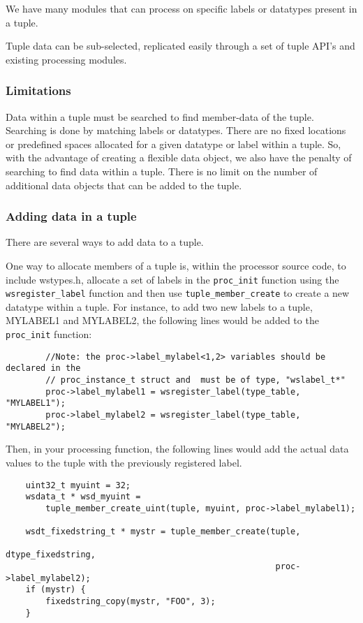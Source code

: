 \documentclass[11pt]{article}
\begin{document}
We have many modules that can process on specific labels or datatypes present 
in a tuple. 

Tuple data can be sub-selected, replicated easily through a set of tuple API's 
and existing processing modules.

\subsubsection{Limitations}
Data within a tuple must be searched to find member-data of the tuple.  
Searching is done by matching labels or datatypes. There are no fixed locations 
or  predefined spaces allocated for a given datatype or label within a tuple. 
So, with the advantage of creating a flexible data object, we also have the 
penalty of searching to find data within a tuple.  There is no limit on 
the number of additional data objects that can be added to the tuple.  

\subsubsection{Adding data in a tuple}\label{sec:addingdata}
There are several ways to add data to a tuple. 

One way to allocate members of a tuple is, within the processor source code, to
include wstypes.h, allocate a set of labels in the \texttt{proc\_init} function
using the \texttt{wsregister\_label} function and then use 
\texttt{tuple\_member\_create} to create a new datatype within a tuple. For 
instance, to add two new labels to a tuple, MYLABEL1 and MYLABEL2, the 
following lines would be added to the \texttt{proc\_init} function:

\begin{lstlisting}
        //Note: the proc->label_mylabel<1,2> variables should be declared in the
        // proc_instance_t struct and  must be of type, "wslabel_t*"
        proc->label_mylabel1 = wsregister_label(type_table, "MYLABEL1");
        proc->label_mylabel2 = wsregister_label(type_table, "MYLABEL2");
\end{lstlisting}
 
Then, in your processing function, the following lines would add the actual 
data values to the tuple with the previously registered label.

\begin{lstlisting}
	uint32_t myuint = 32;
	wsdata_t * wsd_myuint =
		tuple_member_create_uint(tuple, myuint, proc->label_mylabel1);

	wsdt_fixedstring_t * mystr = tuple_member_create(tuple,
                                                      dtype_fixedstring,
                                                      proc->label_mylabel2);
	if (mystr) {
		fixedstring_copy(mystr, "FOO", 3);
	}
\end{lstlisting}
\end{document}
